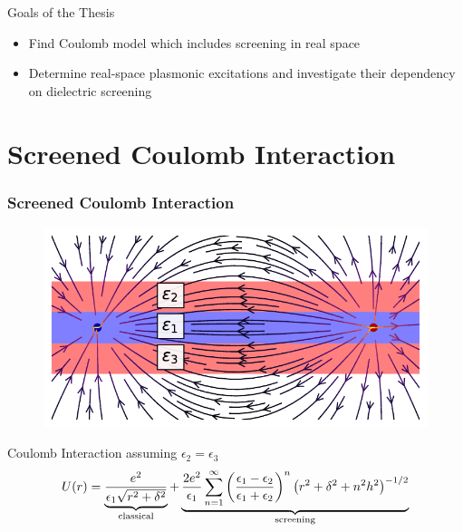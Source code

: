 \documentclass{beamer}
\begin{document}
\begin{frame}
    \begin{block}{Goals of the Thesis}
     \begin{itemize}
        \item Find Coulomb model which includes screening in real space
        \item Determine real-space plasmonic excitations and investigate their dependency on dielectric screening
    \end{itemize}
    \end{block}
\end{frame}

\section{Screened Coulomb Interaction}
\begin{frame}
    \frametitle{Screened Coulomb Interaction}
    \begin{figure}
        \centering
        \includegraphics[width=.6\textwidth]{img/FSG_large.pdf}
    \end{figure}
    \begin{block}{Coulomb Interaction assuming $\epsilon_2=\epsilon_3$}
    \begin{equation*}
        U(r)= \underbrace{\frac{e^2}{\epsilon_1 \sqrt{r^2+\delta^2}}}_{\text{classical}} +   \underbrace{\frac{2e^2}{\epsilon_1}\sum_{n=1}^\infty\left(\frac{\epsilon_1-\epsilon_2}{\epsilon_1+\epsilon_2}\right)^{n}\left(r^2+\delta^2+n^2h^2\right)^{-1/2}}_{\text{screening}}
    \end{equation*}
    \end{block}
\end{frame}
\end{document}
